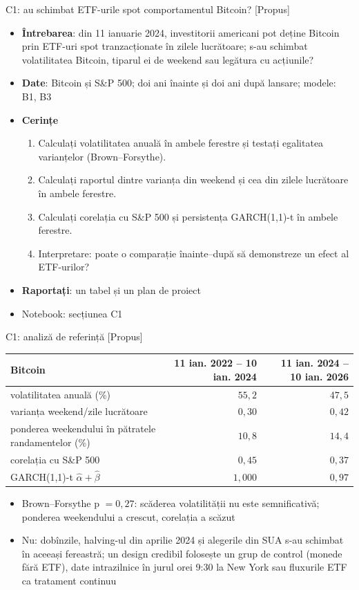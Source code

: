 \begin{frame}{C1: au schimbat ETF-urile spot comportamentul Bitcoin? [Propus]}
\itemsize{\footnotesize}
\begin{itemize}
\item \textbf{Întrebarea}: din 11 ianuarie 2024, investitorii americani pot deține Bitcoin prin ETF-uri spot tranzacționate în zilele lucrătoare; s-au schimbat volatilitatea Bitcoin, tiparul ei de weekend sau legătura cu acțiunile?
\item \textbf{Date}: Bitcoin și S\&P 500; doi ani înainte și doi ani după lansare; modele: B1, B3
\item \textbf{Cerințe}
\begin{enumerate}
    \item Calculați volatilitatea anuală în ambele ferestre și testați egalitatea varianțelor (Brown--Forsythe).
    \item Calculați raportul dintre varianța din weekend și cea din zilele lucrătoare în ambele ferestre.
    \item Calculați corelația cu S\&P 500 și persistența GARCH(1,1)-t în ambele ferestre.
    \item Interpretare: poate o comparație înainte--după să demonstreze un efect al ETF-urilor?
\end{enumerate}
\item \textbf{Raportați}: un tabel și un plan de proiect
\item Notebook: secțiunea C1
\end{itemize}
\end{frame}

\ifsolutions
\begin{frame}{C1: analiză de referință [Propus]}
\itemsize{\footnotesize}
\begin{center}
\scriptsize
\begin{tabular}{lrr}
\toprule
Bitcoin & 11 ian. 2022 -- 10 ian. 2024 & 11 ian. 2024 -- 10 ian. 2026 \\
\midrule
volatilitatea anuală (\%) & $55{,}2$ & $47{,}5$ \\
varianța weekend/zile lucrătoare & $0{,}30$ & $0{,}42$ \\
ponderea weekendului în pătratele randamentelor (\%) & $10{,}8$ & $14{,}4$ \\
corelația cu S\&P 500 & $0{,}45$ & $0{,}37$ \\
GARCH(1,1)-t $\hat\alpha + \hat\beta$ & $1{,}000$ & $0{,}97$ \\
\bottomrule
\end{tabular}
\end{center}
\begin{itemize}
    \item Brown--Forsythe p $= 0{,}27$: scăderea volatilității nu este semnificativă; ponderea weekendului a crescut, corelația a scăzut
    \item Nu: dobînzile, halving-ul din aprilie 2024 și alegerile din SUA s-au schimbat în aceeași fereastră; un design credibil folosește un grup de control (monede fără ETF), date intrazilnice în jurul orei 9:30 la New York sau fluxurile ETF ca tratament continuu
\end{itemize}
\end{frame}
\fi

